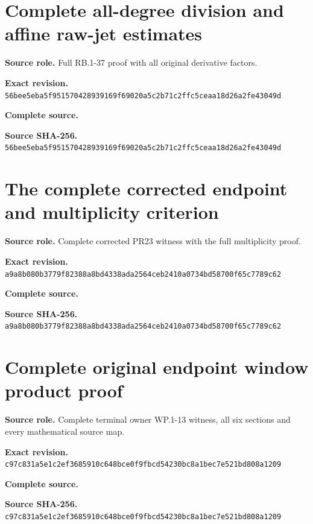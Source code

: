 \begingroup
\sloppy
\small
\clearpage
\section{Complete all-degree division and affine raw-jet estimates}
\noindent\textbf{Source role.} Full RB.1-37 proof with all original derivative factors.\par
\noindent\textbf{Exact revision.} \nolinkurl{56bee5eba5f951570428939169f69020a5c2b71c2ffc5ceaa18d26a2fe43049d}\par
\noindent\textbf{Complete source.} \par
\noindent\textbf{Source SHA-256.} \nolinkurl{56bee5eba5f951570428939169f69020a5c2b71c2ffc5ceaa18d26a2fe43049d}\par\medskip

\endgroup

\begingroup
\sloppy
\small
\clearpage
\section{The complete corrected endpoint and multiplicity criterion}
\noindent\textbf{Source role.} Complete corrected PR23 witness with the full multiplicity proof.\par
\noindent\textbf{Exact revision.} \nolinkurl{a9a8b080b3779f82388a8bd4338ada2564ceb2410a0734bd58700f65c7789c62}\par
\noindent\textbf{Complete source.} \par
\noindent\textbf{Source SHA-256.} \nolinkurl{a9a8b080b3779f82388a8bd4338ada2564ceb2410a0734bd58700f65c7789c62}\par\medskip

\endgroup

\begingroup
\sloppy
\small
\clearpage
\section{Complete original endpoint window product proof}
\noindent\textbf{Source role.} Complete terminal owner WP.1-13 witness, all six sections and every mathematical source map.\par
\noindent\textbf{Exact revision.} \nolinkurl{c97c831a5e1c2ef3685910c648bce0f9fbcd54230bc8a1bec7e521bd808a1209}\par
\noindent\textbf{Complete source.} \par
\noindent\textbf{Source SHA-256.} \nolinkurl{c97c831a5e1c2ef3685910c648bce0f9fbcd54230bc8a1bec7e521bd808a1209}\par\medskip

\endgroup

